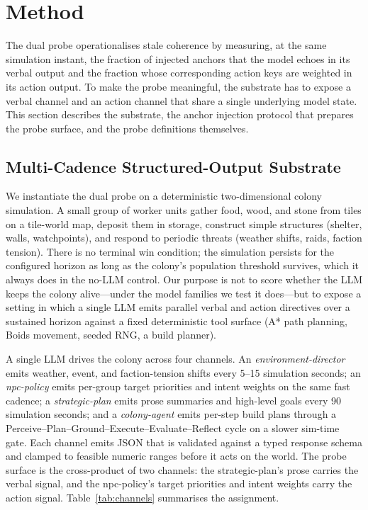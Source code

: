 \section{Method}
\label{sec:method}

The dual probe operationalises stale coherence by measuring, at the
same simulation instant, the fraction of injected anchors that the
model echoes in its verbal output and the fraction whose
corresponding action keys are weighted in its action output. To
make the probe meaningful, the substrate has to expose a verbal
channel and an action channel that share a single underlying model
state. This section describes the substrate, the anchor injection
protocol that prepares the probe surface, and the probe definitions
themselves.

\subsection{Multi-Cadence Structured-Output Substrate}
\label{sec:method:substrate}

We instantiate the dual probe on a deterministic two-dimensional
colony simulation. A small group of worker units gather food,
wood, and stone from tiles on a tile-world map, deposit them in
storage, construct simple structures (shelter, walls, watchpoints),
and respond to periodic threats (weather shifts, raids, faction
tension). There is no terminal win condition; the simulation
persists for the configured horizon as long as the colony's
population threshold survives, which it always does in the no-LLM
control. Our purpose is not to score whether the LLM keeps the
colony alive---under the model families we test it does---but to
expose a setting in which a single LLM emits parallel verbal and
action directives over a sustained horizon against a fixed
deterministic tool surface (A* path planning, Boids movement,
seeded RNG, a build planner).

A single LLM drives the colony across four channels.
An \emph{environment-director} emits weather, event, and
faction-tension shifts every 5--15 simulation seconds; an
\emph{npc-policy} emits per-group target priorities and intent
weights on the same fast cadence; a \emph{strategic-plan} emits
prose summaries and high-level goals every 90 simulation seconds;
and a \emph{colony-agent} emits per-step build plans through a
Perceive--Plan--Ground--Execute--Evaluate--Reflect cycle on a
slower sim-time gate. Each channel emits JSON that is validated
against a typed response schema and clamped to feasible numeric
ranges before it acts on the world. The probe surface is the
cross-product of two channels: the strategic-plan's prose carries
the verbal signal, and the npc-policy's target priorities and
intent weights carry the action signal. Table~\ref{tab:channels}
summarises the assignment.


